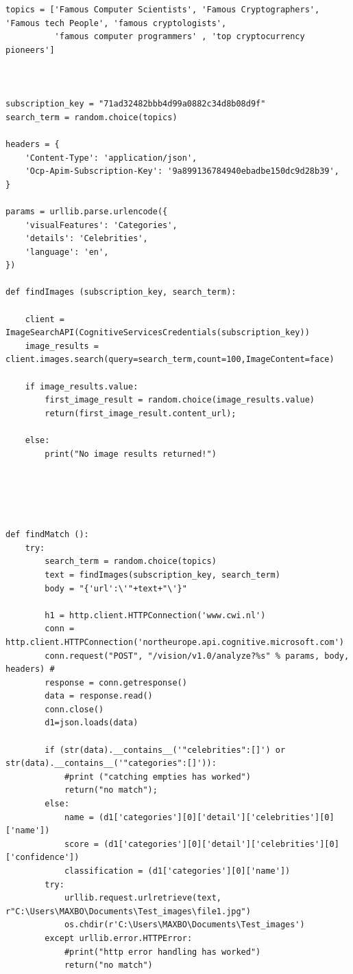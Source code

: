 \documentclass[12pt,a4paper]{article}
\begin{document}
\begin{appendices}
\begin{lstlisting}
topics = ['Famous Computer Scientists', 'Famous Cryptographers', 'Famous tech People', 'famous cryptologists', 
          'famous computer programmers' , 'top cryptocurrency pioneers']



subscription_key = "71ad32482bbb4d99a0882c34d8b08d9f"
search_term = random.choice(topics)   

headers = {
    'Content-Type': 'application/json',
    'Ocp-Apim-Subscription-Key': '9a899136784940ebadbe150dc9d28b39',
}

params = urllib.parse.urlencode({
    'visualFeatures': 'Categories',
    'details': 'Celebrities',
    'language': 'en',
})

def findImages (subscription_key, search_term):

    client = ImageSearchAPI(CognitiveServicesCredentials(subscription_key)) 
    image_results = client.images.search(query=search_term,count=100,ImageContent=face) 

    if image_results.value:
        first_image_result = random.choice(image_results.value)  
        return(first_image_result.content_url); 

    else:
        print("No image results returned!") 
    
    



def findMatch (): 
    try:    
        search_term = random.choice(topics) 
        text = findImages(subscription_key, search_term)  
        body = "{'url':\'"+text+"\'}" 

        h1 = http.client.HTTPConnection('www.cwi.nl')
        conn = http.client.HTTPConnection('northeurope.api.cognitive.microsoft.com') 
        conn.request("POST", "/vision/v1.0/analyze?%s" % params, body, headers) #
        response = conn.getresponse() 
        data = response.read() 
        conn.close() 
        d1=json.loads(data)     
         
        if (str(data).__contains__('"celebrities":[]') or str(data).__contains__('"categories":[]')):  
            #print ("catching empties has worked")
            return("no match");    
        else:  
            name = (d1['categories'][0]['detail']['celebrities'][0]['name']) 
            score = (d1['categories'][0]['detail']['celebrities'][0]['confidence']) 
            classification = (d1['categories'][0]['name'])       
        try:
            urllib.request.urlretrieve(text, r"C:\Users\MAXBO\Documents\Test_images\file1.jpg")  
            os.chdir(r'C:\Users\MAXBO\Documents\Test_images') 
        except urllib.error.HTTPError:  
            #print("http error handling has worked")
            return("no match")    
        


\end{lstlisting}
\end{appendices}
\end{document}
